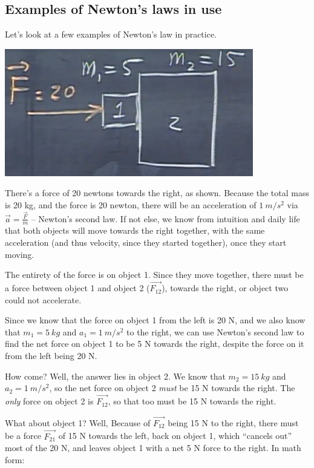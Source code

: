 \documentclass[8.01x]{subfiles}
\begin{document}
\subsection{Examples of Newton's laws in use}

Let's look at a few examples of Newton's law in practice.

\begin{center}
\includegraphics[scale=0.6]{Graphics/lec6_newton3_force}
\end{center}

There's a force of 20 newtons towards the right, as shown. Because the total mass is 20 kg, and the force is 20 newton, there will be an acceleration of $\SI{1}{m/s^2}$ via $\displaystyle \vec{a} = \frac{\vec{F}}{m}$ -- Newton's second law. If not else, we know from intuition and daily life that both objects will move towards the right together, with the same acceleration (and thus velocity, since they started together), once they start moving.

The entirety of the force is on object 1. Since they move together, there must be a force between object 1 and object 2 ($\vec{F_{12}}$), towards the right, or object two could not accelerate.

Since we know that the force on object 1 from the left is 20 N, and we also know that $m_1 = \SI{5}{kg}$ and $a_1 = \SI{1}{m/s^2}$ to the right, we can use Newton's second law to find the net force on object 1 to be 5 N towards the right, despite the force on it from the left being 20 N.

How come? Well, the answer lies in object 2. We know that $m_2 = \SI{15}{kg}$ and $a_2 = \SI{1}{m/s^2}$, so the net force on object 2 \emph{must} be 15 N towards the right. The \emph{only} force on object 2 is $\vec{F_{12}}$, so that too must be 15 N towards the right.

What about object 1? Well, Because of $\vec{F_{12}}$ being 15 N to the right, there must be a force $\vec{F_{21}}$ of 15 N towards the left, back on object 1, which ``cancels out'' most of the 20 N, and leaves object 1 with a net 5 N force to the right. In math form:
\end{document}
